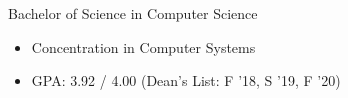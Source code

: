 %
%
%


\begin{projects}

    {Bachelor of Science in Computer Science}
    {
    \begin{itemize}
        \item Concentration in Computer Systems
		\item GPA: 3.92 / 4.00 \hspace{1em}(Dean's List: F '18, S '19, F '20)
	\end{itemize}
    }

\end{projects}
